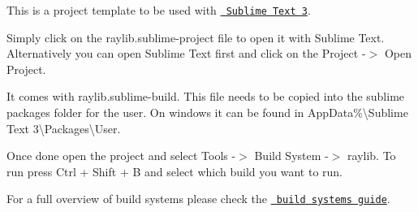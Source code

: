 This is a project template to be used with \href{https://www.sublimetext.com/}{\texttt{ Sublime Text 3}}.

Simply click on the {\ttfamily raylib.\+sublime-\/project} file to open it with Sublime Text. Alternatively you can open Sublime Text first and click on the {\ttfamily Project -\/\texorpdfstring{$>$}{>} Open Project}.

It comes with raylib.\+sublime-\/build. This file needs to be copied into the sublime packages folder for the user. On windows it can be found in {\ttfamily App\+Data\%\textbackslash{}Sublime Text 3\textbackslash{}Packages\textbackslash{}User}.

Once done open the project and select {\ttfamily Tools -\/\texorpdfstring{$>$}{>} Build System -\/\texorpdfstring{$>$}{>} raylib}. To run press Ctrl + Shift + B and select which build you want to run.

For a full overview of build systems please check the \href{https://www.sublimetext.com/docs/3/build_systems.html}{\texttt{ build systems guide}}. 